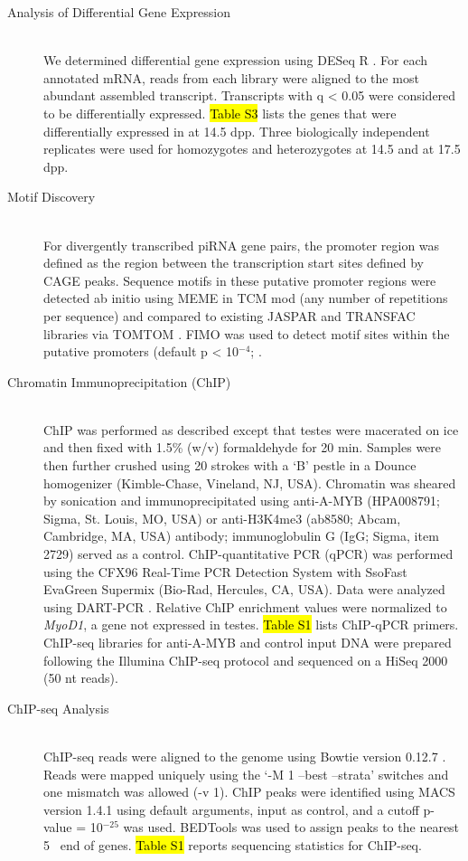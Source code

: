 \begin{description}
    \item[Analysis of Differential Gene Expression ] \hfill \\
    We determined differential gene expression using DESeq R \citep{Anders2010a}. For each annotated mRNA, reads from each library were aligned to the most abundant assembled transcript. Transcripts with q < 0.05 were considered to be differentially expressed. \hl{Table S3} lists the genes that were differentially expressed in \amyb{} at 14.5 dpp. Three biologically independent replicates were used for \amyb homozygotes and heterozygotes at 14.5 and at 17.5 dpp.

    \item[Motif Discovery] \hfill \\
    For divergently transcribed piRNA gene pairs, the promoter region was defined as the region between the transcription start sites defined by CAGE peaks. Sequence motifs in these putative promoter regions were detected ab initio using MEME \citep{Bailey1994, Bailey2009} in TCM mod (any number of repetitions per sequence) and compared to existing JASPAR and TRANSFAC libraries via TOMTOM \citep{Gupta2007}. FIMO was used to detect motif sites within the putative promoters (default p < 10$^{-4}$; \citep{Grant2011}.

    \item[Chromatin Immunoprecipitation (ChIP)] \hfill \\
    ChIP was performed as described \citep{Chen2008} except that testes were macerated on ice and then fixed with 1.5\% (w/v) formaldehyde for 20 min. Samples were then further crushed using 20 strokes with a ‘B’ pestle in a Dounce homogenizer (Kimble-Chase, Vineland, NJ, USA). Chromatin was sheared by sonication and immunoprecipitated using anti-A-MYB (HPA008791; Sigma, St. Louis, MO, USA) or anti-H3K4me3 (ab8580; Abcam, Cambridge, MA, USA) antibody; immunoglobulin G (IgG; Sigma, item 2729) served as a control. ChIP-quantitative PCR (qPCR) was performed using the CFX96 Real-Time PCR Detection System with SsoFast EvaGreen Supermix (Bio-Rad, Hercules, CA, USA). Data were analyzed using DART-PCR \citep{Peirson2003}. Relative ChIP enrichment values were normalized to \textit{MyoD1}, a gene not expressed in testes. \hl{Table S1} lists ChIP-qPCR primers. ChIP-seq libraries for anti-A-MYB and control input DNA were prepared following the Illumina ChIP-seq protocol and sequenced on a HiSeq 2000 (50 nt reads).

    \item[ChIP-seq Analysis] \hfill \\
    ChIP-seq reads were aligned to the genome using Bowtie version 0.12.7 \citep{Langmead2009}. Reads were mapped uniquely using the ‘-M 1 --best --strata’ switches and one mismatch was allowed (-v 1). ChIP peaks were identified using MACS version 1.4.1 \citep{Zhang2008} using default arguments, input as control, and a cutoff p-value = 10$^{-25}$ was used. BEDTools was used to assign peaks to the nearest 5\textprime~ end of genes. \hl{Table S1} reports sequencing statistics for ChIP-seq.


\end{description}
